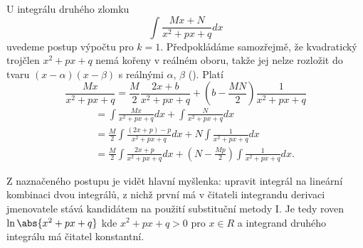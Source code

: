        U integrálu druhého zlomku 
       \begin{equation}\label{mai:eq137}
        \boxed{\int{\frac{Mx + N}{x^2+px+q}dx}}
      \end{equation} 
       uvedeme postup výpočtu pro $k = 1$. Předpokládáme samozřejmě, že kvadratický trojčlen
       \(x^2+px+q\) nemá kořeny v reálném oboru, takže jej nelze rozložit do tvaru \((x - \alpha)(x
       - \beta)\) s reálnými \(\alpha\), \(\beta\) (\cite[p.~140]{Musilova2009MA1}). Platí 
      \begin{equation*}
        \frac{Mx}{x^2+px+q} 
          = \frac{M}{2}\frac{2x +b}{x^2+px+q} + \left(b - \frac{MN}{2}\right)\frac{1}{x^2+px+q}
      \end{equation*} 
      \begin{align*}
        \quad &=   \int{\frac{Mx}{x^2+px+q}dx} + \int{\frac{N}{x^2+px+q}dx}     \\  
        \quad &=   \frac{M}{2}\int{\frac{(2x + p) - p}{x^2+px+q}dx} + 
                  N\int{\frac{1}{x^2+px+q}dx}                                   \\ 
        \quad &=   \frac{M}{2}\int{\frac{2x + p}{x^2+px+q}dx} + 
                  \left(N-\frac{Mp}{2}\right)\int{\frac{1}{x^2+px+q}dx.}                   
      \end{align*}  
      
      Z naznačeného postupu je vidět hlavní myšlenka: upravit integrál na lineární kombinaci dvou
      integrálů, z nichž první má v čitateli integrandu derivaci jmenovatele stává kandidátem na
      použití substituční metody I. Je tedy roven $\ln\abs{x^2+px+q}$ kde $x^2+px+q >0$ pro $x\in R$
      a integrand druhého integrálu má čitatel konstantní.
      
